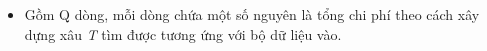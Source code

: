 \begin{itemize}
	\item Gồm Q dòng, mỗi dòng chứa một số nguyên là tổng chi phí theo cách xây dựng xâu \emph{ T } tìm được tương ứng với bộ dữ liệu vào.
\end{itemize}